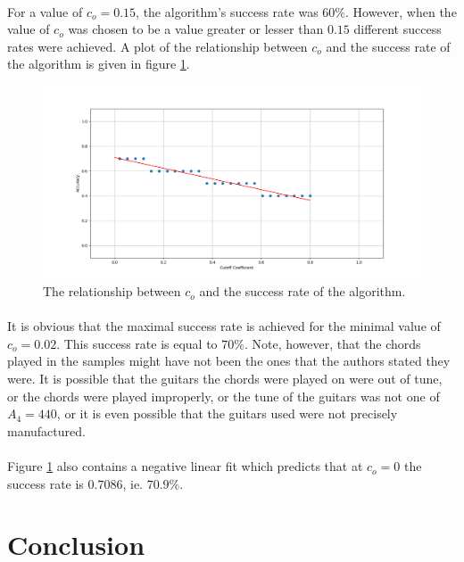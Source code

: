 \documentclass{article}
\begin{document}
\paragraph*{}
For a value of $c_o = 0.15$, the algorithm's success rate was $60\%$. However, 
when the value of $c_o$ was chosen to be a value greater or lesser than $0.15$ 
different success rates were achieved. A plot of the relationship between 
$c_o$ and the success rate of the algorithm is given in figure 
\ref{fig:success-rate}.
\begin{figure}[ht]
	\centering
	\includegraphics[width=\textwidth]{img/success-rate}
	\caption{The relationship between $c_o$ and the success rate of the 
	algorithm.}
	\label{fig:success-rate}
\end{figure}

\paragraph*{}
It is obvious that the maximal success rate is achieved for the minimal value 
of $c_o = 0.02$. This success rate is equal to $70\%$. Note, however, that 
the chords played in the samples might have not been the ones that the authors 
stated they were. It is possible that the guitars the chords were played on 
were out of tune, or the chords were played improperly, or the tune of the 
guitars was not one of $A_4 = 440$, or it is even possible that the guitars 
used were not precisely manufactured.

\paragraph*{}
Figure \ref{fig:success-rate} also contains a negative linear fit which
predicts that at $c_o = 0$ the success rate is $0.7086$, ie. $70.9\%$.

\section{Conclusion}
\end{document}
